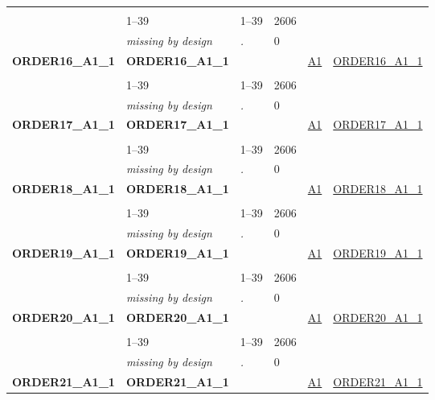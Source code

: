 \begin{longtable}{| L{2.45cm} | L{6cm} | C{1.5cm} | R{1cm} | C{2.25cm} | C{2.25cm} |}
   &  &  &  &  &  \\ 
   & 1--39 & 1--39 & 2606 &  &  \\ 
   & \textit{missing by design} & \textit{.} & 0 &  &  \\ 
   \midrule
\textbf{ORDER16\_A1\_1}\label{var:ORDER16:A1:1} & \textbf{ORDER16\_A1\_1} &  &  & \hyperref[A1]{A1} & \hyperref[var:suf:ORDER16:A1:1]{ORDER16\_A1\_1} \\ 
   &  &  &  &  &  \\ 
   & 1--39 & 1--39 & 2606 &  &  \\ 
   & \textit{missing by design} & \textit{.} & 0 &  &  \\ 
   \midrule
\textbf{ORDER17\_A1\_1}\label{var:ORDER17:A1:1} & \textbf{ORDER17\_A1\_1} &  &  & \hyperref[A1]{A1} & \hyperref[var:suf:ORDER17:A1:1]{ORDER17\_A1\_1} \\ 
   &  &  &  &  &  \\ 
   & 1--39 & 1--39 & 2606 &  &  \\ 
   & \textit{missing by design} & \textit{.} & 0 &  &  \\ 
   \midrule
\textbf{ORDER18\_A1\_1}\label{var:ORDER18:A1:1} & \textbf{ORDER18\_A1\_1} &  &  & \hyperref[A1]{A1} & \hyperref[var:suf:ORDER18:A1:1]{ORDER18\_A1\_1} \\ 
   &  &  &  &  &  \\ 
   & 1--39 & 1--39 & 2606 &  &  \\ 
   & \textit{missing by design} & \textit{.} & 0 &  &  \\ 
   \midrule
\textbf{ORDER19\_A1\_1}\label{var:ORDER19:A1:1} & \textbf{ORDER19\_A1\_1} &  &  & \hyperref[A1]{A1} & \hyperref[var:suf:ORDER19:A1:1]{ORDER19\_A1\_1} \\ 
   &  &  &  &  &  \\ 
   & 1--39 & 1--39 & 2606 &  &  \\ 
   & \textit{missing by design} & \textit{.} & 0 &  &  \\ 
   \midrule
\textbf{ORDER20\_A1\_1}\label{var:ORDER20:A1:1} & \textbf{ORDER20\_A1\_1} &  &  & \hyperref[A1]{A1} & \hyperref[var:suf:ORDER20:A1:1]{ORDER20\_A1\_1} \\ 
   &  &  &  &  &  \\ 
   & 1--39 & 1--39 & 2606 &  &  \\ 
   & \textit{missing by design} & \textit{.} & 0 &  &  \\ 
   \midrule
\textbf{ORDER21\_A1\_1}\label{var:ORDER21:A1:1} & \textbf{ORDER21\_A1\_1} &  &  & \hyperref[A1]{A1} & \hyperref[var:suf:ORDER21:A1:1]{ORDER21\_A1\_1} \\ 

\end{longtable}
